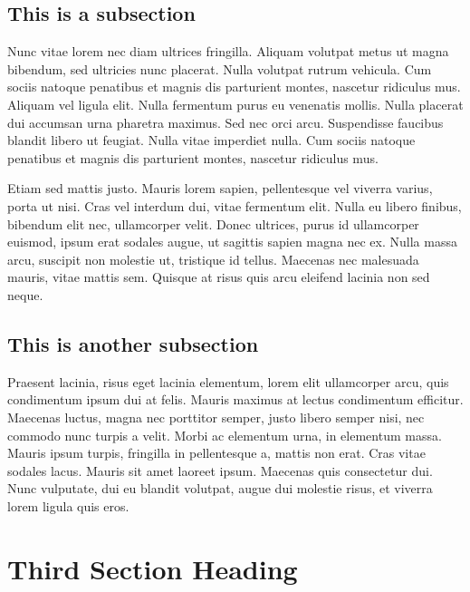 \documentclass{acmsiggraph}
\begin{document}
\subsection{This is a subsection}

Nunc vitae lorem nec diam ultrices fringilla. Aliquam volutpat metus ut magna bibendum, sed ultricies nunc placerat. Nulla volutpat rutrum vehicula. Cum sociis natoque penatibus et magnis dis parturient montes, nascetur ridiculus mus. Aliquam vel ligula elit. Nulla fermentum purus eu venenatis mollis. Nulla placerat dui accumsan urna pharetra maximus. Sed nec orci arcu. Suspendisse faucibus blandit libero ut feugiat. Nulla vitae imperdiet nulla. Cum sociis natoque penatibus et magnis dis parturient montes, nascetur ridiculus mus.

Etiam sed mattis justo. Mauris lorem sapien, pellentesque vel viverra varius, porta ut nisi. Cras vel interdum dui, vitae fermentum elit. Nulla eu libero finibus, bibendum elit nec, ullamcorper velit. Donec ultrices, purus id ullamcorper euismod, ipsum erat sodales augue, ut sagittis sapien magna nec ex. Nulla massa arcu, suscipit non molestie ut, tristique id tellus. Maecenas nec malesuada mauris, vitae mattis sem. Quisque at risus quis arcu eleifend lacinia non sed neque.

\subsection{This is another subsection}

Praesent lacinia, risus eget lacinia elementum, lorem elit ullamcorper arcu, quis condimentum ipsum dui at felis. Mauris maximus at lectus condimentum efficitur. Maecenas luctus, magna nec porttitor semper, justo libero semper nisi, nec commodo nunc turpis a velit. Morbi ac elementum urna, in elementum massa. Mauris ipsum turpis, fringilla in pellentesque a, mattis non erat. Cras vitae sodales lacus. Mauris sit amet laoreet ipsum. Maecenas quis consectetur dui. Nunc vulputate, dui eu blandit volutpat, augue dui molestie risus, et viverra lorem ligula quis eros.


\section{Third Section Heading}
\end{document}
